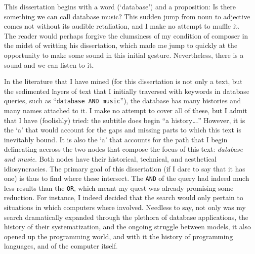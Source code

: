 This dissertation begins with a word (`database') and a proposition: Is there something we can call database music? This sudden jump from noun to adjective comes not without its audible retaliation, and I make no attempt to muffle it. The reader would perhaps forgive the clumsiness of my condition of composer in the midst of writting his dissertation, which made me jump to quickly at the opportunity to make some sound in this initial gesture. Nevertheless, there is a sound and we can listen to it.

In the literature that I have mined (for this dissertation is not only a text, but the sedimented layers of text that I initially traversed with keywords in database queries, such as ``\texttt{database AND music}''), the database has many histories and many names attached to it. I make no attempt to cover all of these, but I admit that I have (foolishly) tried: the subtitle does begin ``a history\dots.'' However, it is the `a' that would account for the gaps and missing parts to which this text is inevitably bound. It is also the `a' that accounts for the path that I begin delineating accross the two nodes that compose the focus of this text: \textit{database and music}. Both nodes have their historical, technical, and aesthetical idiosyncracies. The primary goal of this dissertation (if I dare to say that it has one) is thus to find where these intersect. The \texttt{AND} of the query had indeed much less results than the \texttt{OR}, which meant my quest was already promising some reduction. For instance, I indeed decided that the search would only pertain to situations in which computers where involved. Needless to say, not only was my search dramatically expanded through the plethora of database applications, the history of their systematization, and the ongoing struggle between models, it also opened up the programming world, and with it the history of programming languages, and of the computer itself. 


